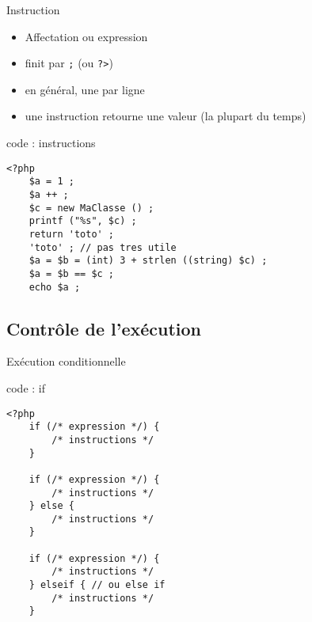 \begin{frame}[containsverbatim]{Instruction}
	\begin{itemize}
		\item Affectation ou expression
		\item finit par \texttt{;} (ou \texttt{?>})
		\item en général, une par ligne
		\item une instruction retourne une valeur (la plupart du temps)
	\end{itemize}
	\begin{block}{code : instructions}
		\begin{lstlisting}
<?php
	$a = 1 ;
	$a ++ ;
	$c = new MaClasse () ;
	printf ("%s", $c) ;
	return 'toto' ;
	'toto' ; // pas tres utile
	$a = $b = (int) 3 + strlen ((string) $c) ;
	$a = $b == $c ;
	echo $a ;
		\end{lstlisting}
	\end{block}
\end{frame}

\subsection{Contrôle de l’exécution}

\begin{frame}[containsverbatim]{Exécution conditionnelle} %
	\begin{block}{code : if}
		\begin{lstlisting}
<?php
	if (/* expression */) {
		/* instructions */
	}
	
	if (/* expression */) {
		/* instructions */
	} else {
		/* instructions */
	}
	
	if (/* expression */) {
		/* instructions */
	} elseif { // ou else if
		/* instructions */
	}
		\end{lstlisting}
	\end{block}
\end{frame}

